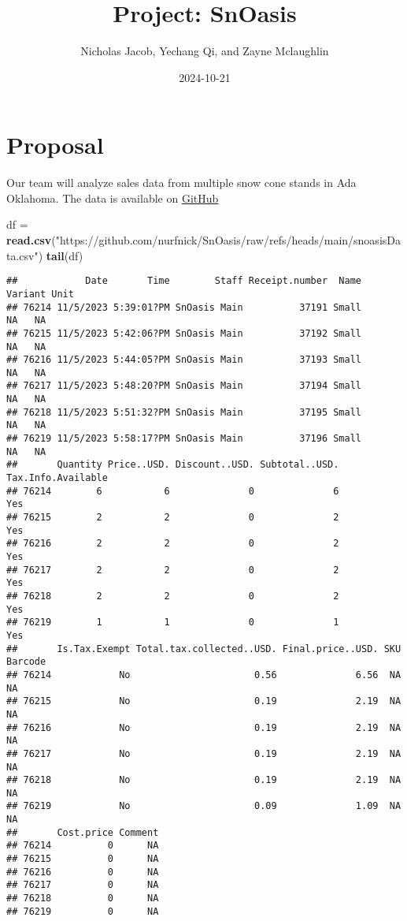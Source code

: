 \documentclass[
]{article}
\title{Project: SnOasis}
\author{Nicholas Jacob, Yechang Qi, and Zayne Mclaughlin}
\date{2024-10-21}
\newenvironment{Shaded}{\begin{snugshade}}{\end{snugshade}}
\newcommand{\FunctionTok}[1]{\textcolor[rgb]{0.13,0.29,0.53}{\textbf{#1}}}
\newcommand{\NormalTok}[1]{#1}
\newcommand{\OtherTok}[1]{\textcolor[rgb]{0.56,0.35,0.01}{#1}}
\newcommand{\StringTok}[1]{\textcolor[rgb]{0.31,0.60,0.02}{#1}}
\begin{document}
\maketitle

\hypertarget{proposal}{%
\section{Proposal}\label{proposal}}

Our team will analyze sales data from multiple snow cone stands in Ada
Oklahoma. The data is available on
\href{https://github.com/nurfnick/SnOasis/refs/heads/main/snoasisData.csv}{GitHub}

\begin{Shaded}
\begin{Highlighting}[]
\NormalTok{df }\OtherTok{=} \FunctionTok{read.csv}\NormalTok{(}\StringTok{"https://github.com/nurfnick/SnOasis/raw/refs/heads/main/snoasisData.csv"}\NormalTok{)}
\FunctionTok{tail}\NormalTok{(df)}
\end{Highlighting}
\end{Shaded}

\begin{verbatim}
##            Date       Time        Staff Receipt.number  Name Variant Unit
## 76214 11/5/2023 5:39:01?PM SnOasis Main          37191 Small      NA   NA
## 76215 11/5/2023 5:42:06?PM SnOasis Main          37192 Small      NA   NA
## 76216 11/5/2023 5:44:05?PM SnOasis Main          37193 Small      NA   NA
## 76217 11/5/2023 5:48:20?PM SnOasis Main          37194 Small      NA   NA
## 76218 11/5/2023 5:51:32?PM SnOasis Main          37195 Small      NA   NA
## 76219 11/5/2023 5:58:17?PM SnOasis Main          37196 Small      NA   NA
##       Quantity Price..USD. Discount..USD. Subtotal..USD. Tax.Info.Available
## 76214        6           6              0              6                Yes
## 76215        2           2              0              2                Yes
## 76216        2           2              0              2                Yes
## 76217        2           2              0              2                Yes
## 76218        2           2              0              2                Yes
## 76219        1           1              0              1                Yes
##       Is.Tax.Exempt Total.tax.collected..USD. Final.price..USD. SKU Barcode
## 76214            No                      0.56              6.56  NA      NA
## 76215            No                      0.19              2.19  NA      NA
## 76216            No                      0.19              2.19  NA      NA
## 76217            No                      0.19              2.19  NA      NA
## 76218            No                      0.19              2.19  NA      NA
## 76219            No                      0.09              1.09  NA      NA
##       Cost.price Comment
## 76214          0      NA
## 76215          0      NA
## 76216          0      NA
## 76217          0      NA
## 76218          0      NA
## 76219          0      NA
\end{verbatim}
\end{document}

